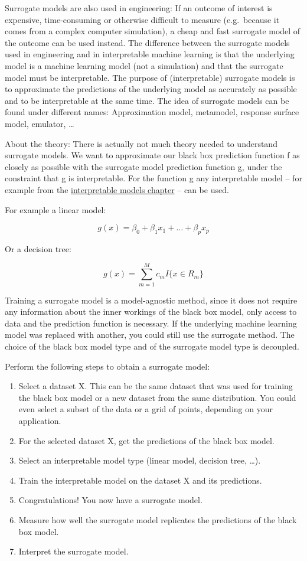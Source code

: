 \documentclass[
  11pt,
]{scrbook}
\providecommand{\tightlist}{%
  \setlength{\itemsep}{0pt}\setlength{\parskip}{0pt}}
\begin{document}
Surrogate models are also used in engineering:
If an outcome of interest is expensive, time-consuming or otherwise difficult to measure (e.g.~because it comes from a complex computer simulation), a cheap and fast surrogate model of the outcome can be used instead.
The difference between the surrogate models used in engineering and in interpretable machine learning is that the underlying model is a machine learning model (not a simulation) and that the surrogate model must be interpretable.
The purpose of (interpretable) surrogate models is to approximate the predictions of the underlying model as accurately as possible and to be interpretable at the same time.
The idea of surrogate models can be found under different names:
Approximation model, metamodel, response surface model, emulator, \ldots{}

About the theory:
There is actually not much theory needed to understand surrogate models.
We want to approximate our black box prediction function f as closely as possible with the surrogate model prediction function g, under the constraint that g is interpretable.
For the function g any interpretable model -- for example from the \protect\hyperlink{simple}{interpretable models chapter} -- can be used.

For example a linear model:

\[g(x)=\beta_0+\beta_1{}x_1{}+\ldots+\beta_p{}x_p\]

Or a decision tree:

\[g(x)=\sum_{m=1}^Mc_m{}I\{x\in{}R_m\}\]

Training a surrogate model is a model-agnostic method, since it does not require any information about the inner workings of the black box model, only access to data and the prediction function is necessary.
If the underlying machine learning model was replaced with another, you could still use the surrogate method.
The choice of the black box model type and of the surrogate model type is decoupled.

Perform the following steps to obtain a surrogate model:

\begin{enumerate}
\def\labelenumi{\arabic{enumi}.}
\tightlist
\item
  Select a dataset X.
  This can be the same dataset that was used for training the black box model or a new dataset from the same distribution.
  You could even select a subset of the data or a grid of points, depending on your application.
\item
  For the selected dataset X, get the predictions of the black box model.
\item
  Select an interpretable model type (linear model, decision tree, \ldots).
\item
  Train the interpretable model on the dataset X and its predictions.
\item
  Congratulations! You now have a surrogate model.
\item
  Measure how well the surrogate model replicates the predictions of the black box model.
\item
  Interpret the surrogate model.
\end{enumerate}
\end{document}

